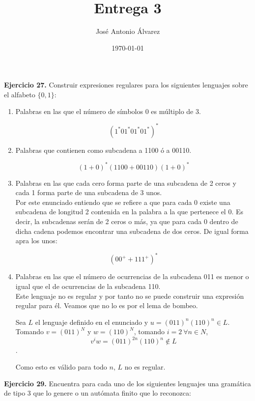 \documentclass[11pt,a4paper]{article}
\title{Entrega 3}
\author{José Antonio Álvarez}
\date{\today}
\begin{document}
\maketitle

\textbf{Ejercicio 27.} Construir expresiones regulares para los siguientes lenguajes sobre el alfabeto $\{0,1\}$: 

\begin {enumerate} 

\item Palabras en las que el número de símbolos 0 es múltiplo de 3.
	
$$(1^*01^*01^*01^*)^*$$
	
\item Palabras que contienen como subcadena a 1100 ó a 00110.
	
$$(1+0)^*(1100 + 00110)(1+0)^*$$
	
\item Palabras en las que cada cero forma parte de una subcadena de 2 ceros y cada 1 forma parte de una subcadena de 3 unos. \\

Por este enunciado entiendo que se refiere a que para cada 0 existe una subcadena de longitud 2 contenida en la palabra a la que pertenece el 0. Es decir, la subcadenas serán de 2 ceros o más, ya que para cada 0 dentro de dicha cadena podemos encontrar una subcadena de dos ceros. De igual forma apra los unos: 

$$(00^+ + 111^+)^*$$

\item Palabras en las que el número de ocurrencias de la subcadena 011 es menor o igual que el de ocurrencias de la subcadena 110. \\

Este lenguaje no es regular y por tanto no se puede construir una expresión regular para él. Veamos que no lo es por el lema de bombeo.

Sea $L$ el lenguaje definido en el enunciado y $u = (011)^n(110)^n \in L$. Tomando $v = (011)^N$ y $w = (110)^N$, tomando $i=2\  \forall n \in N$, $$ v^iw = (011)^{2n}(110)^n \notin L$$.

Como esto es válido para todo $n$, $L$ no es regular. 

\end{enumerate}

\textbf{Ejercicio 29.} Encuentra para cada uno de los siguientes lenguajes una gramática de tipo 3 que lo genere o un autómata finito que lo reconozca: 
\end{document}
